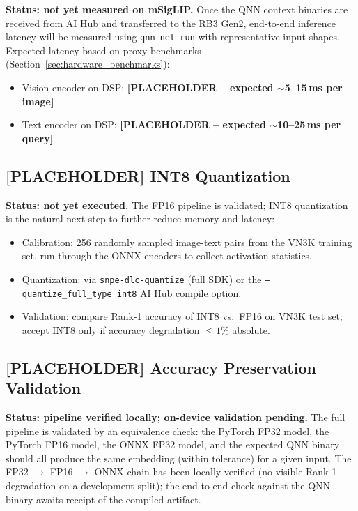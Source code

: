 \documentclass[../main.tex]{subfiles}
\begin{document}
\noindent \textbf{Status: not yet measured on mSigLIP.} Once the QNN context binaries are received from AI Hub and transferred to the RB3 Gen2, end-to-end inference latency will be measured using \texttt{qnn-net-run} with representative input shapes. Expected latency based on proxy benchmarks (Section~\ref{sec:hardware_benchmarks}):

\begin{itemize}
    \item Vision encoder on DSP: \textbf{[PLACEHOLDER -- expected $\sim$5--15\,ms per image]}
    \item Text encoder on DSP: \textbf{[PLACEHOLDER -- expected $\sim$10--25\,ms per query]}
\end{itemize}

\subsection{[PLACEHOLDER] INT8 Quantization}

\noindent \textbf{Status: not yet executed.} The FP16 pipeline is validated; INT8 quantization is the natural next step to further reduce memory and latency:

\begin{itemize}
    \item Calibration: 256 randomly sampled image-text pairs from the VN3K training set, run through the ONNX encoders to collect activation statistics.
    \item Quantization: via \texttt{snpe-dlc-quantize} (full SDK) or the \texttt{--quantize\_full\_type int8} AI Hub compile option.
    \item Validation: compare Rank-1 accuracy of INT8 vs.\ FP16 on VN3K test set; accept INT8 only if accuracy degradation $\leq 1\%$ absolute.
\end{itemize}

\subsection{[PLACEHOLDER] Accuracy Preservation Validation}

\noindent \textbf{Status: pipeline verified locally; on-device validation pending.} The full pipeline is validated by an equivalence check: the PyTorch FP32 model, the PyTorch FP16 model, the ONNX FP32 model, and the expected QNN binary should all produce the same embedding (within tolerance) for a given input. The FP32 $\to$ FP16 $\to$ ONNX chain has been locally verified (no visible Rank-1 degradation on a development split); the end-to-end check against the QNN binary awaits receipt of the compiled artifact.
\end{document}
